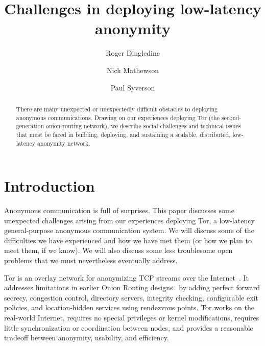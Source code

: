 \documentclass{llncs}
\begin{document}
\title{Challenges in deploying low-latency anonymity}

\author{Roger Dingledine \and
Nick Mathewson \and
Paul Syverson}

\maketitle
\pagestyle{plain}

\begin{abstract}
  There are many unexpected or unexpectedly difficult obstacles to
  deploying anonymous communications.  Drawing on our experiences deploying
  Tor (the second-generation onion routing network), we describe social
  challenges and technical issues that must be faced
  in building, deploying, and sustaining a scalable, distributed, low-latency
  anonymity network.
\end{abstract}

\section{Introduction}
Anonymous communication is full of surprises.  This paper discusses some
unexpected challenges arising from our experiences deploying Tor, a
low-latency general-purpose anonymous communication system.  We will discuss
some of the difficulties we have experienced and how we have met them (or how
we plan to meet them, if we know).  We will also discuss some less
troublesome open problems that we must nevertheless eventually address.

Tor is an overlay network for anonymizing TCP streams over the
Internet~\cite{tor-design}.  It addresses limitations in earlier Onion
Routing designs~\cite{or-ih96,or-jsac98,or-discex00,or-pet00} by adding
perfect forward secrecy, congestion control, directory servers, integrity
checking, configurable exit policies, and location-hidden services using
rendezvous points.  Tor works on the real-world Internet, requires no special
privileges or kernel modifications, requires little synchronization or
coordination between nodes, and provides a reasonable tradeoff between
anonymity, usability, and efficiency.
\end{document}
